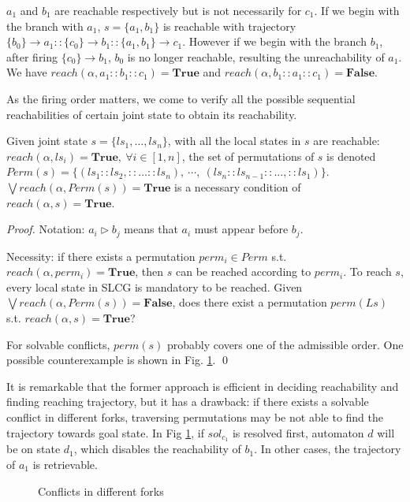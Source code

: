\documentclass[runningheads]{llncs}
\newcommand{\acm}[3]{\{#1\}\rightarrow#3}
\begin{document}
$a_1$ and $b_1$ are reachable respectively but is not necessarily for $c_1$.
If we begin with the branch with $a_1$, $s=\{a_1,b_1\}$ is reachable with trajectory $\acm{b_0}{a_0}{a_1}::\acm{c_0}{b_0}{b_1}::\acm{a_1,b_1}{c_0}{c_1}$. 
However if we begin with the branch $b_1$, after firing $\acm{c_0}{b_0}{b_1}$, $b_0$ is no longer reachable, resulting the unreachability of $a_1$.
We have $reach(\alpha,a_1::b_1::c_1)=\mathbf{True}$ and $reach(\alpha,b_1::a_1::c_1)=\mathbf{False}$.

As the firing order matters, we come to verify all the possible sequential reachabilities of certain joint state to obtain its reachability.

\begin{proposition}\label{theoperm}
Given joint state $s=\{ls_1,\ldots,ls_n\}$, with all the local states in $s$ are reachable: $reach(\alpha,ls_i)=\mathbf{True},\ \forall i\in[1,n]$, the set of permutations of $s$ is denoted $Perm(s)=\{(ls_1::ls_2,::\ldots ::ls_n),\ \cdots,\ (ls_n::ls_{n-1}::\ldots,::ls_1)\}$. $\bigvee reach(\alpha,Perm(s))=\mathbf{True}$ is a necessary condition of $reach(\alpha,s)=\mathbf{True}$.
\end{proposition}
\begin{proof}
Notation: $a_i\triangleright b_j$ means that $a_i$ must appear before $b_j$.

Necessity: if there exists a permutation $perm_i\in Perm$ s.t. $reach(\alpha,perm_i)=\mathbf{True}$, then $s$ can be reached according to $perm_i$.
To reach $s$, every local state in SLCG is mandatory to be reached.
Given $\bigvee reach(\alpha,Perm(s))=\mathbf{False}$, does there exist a permutation $perm(Ls)$ s.t. $reach(\alpha,s)=\mathbf{True}$?

For solvable conflicts, $perm(s)$ probably covers one of the admissible order.
One possible counterexample is shown in Fig. \ref{FigConflictInForks}.
\qed\end{proof}

It is remarkable that the former approach is efficient in deciding reachability and finding reaching trajectory, but it has a drawback: if there exists a solvable conflict in different forks, traversing permutations may be not able to find the trajectory towards goal state.
In Fig \ref{FigConflictInForks}, if $sol_{c_1}$ is resolved first, automaton $d$ will be on state $d_1$, which disables the reachability of $b_1$.
In other cases, the trajectory of $a_1$ is retrievable.
\begin{figure}[ht]
\centering

\caption{Conflicts in different forks}\label{FigConflictInForks}
\end{figure}
\end{document}
